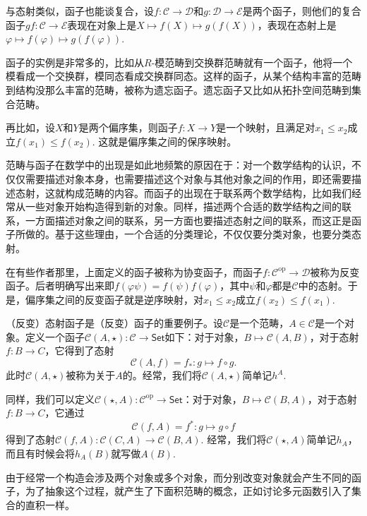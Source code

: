 与态射类似，函子也能谈复合，设$f:\mathcal{C}\to \mathcal{D}$和$g:\mathcal{D}\to \mathcal{E}$是两个函子，则他们的复合函子$gf:\mathcal{C}\to \mathcal{E}$表现在对象上是$X\mapsto f(X)\mapsto g(f(X))$，表现在态射上是$\varphi\mapsto f(\varphi)\mapsto g(f(\varphi))$. 

函子的实例是非常多的，比如从$R$-模范畴到交换群范畴就有一个函子，他将一个模看成一个交换群，模同态看成交换群同态。这样的函子，从某个结构丰富的范畴到结构没那么丰富的范畴，被称为遗忘函子。遗忘函子又比如从拓扑空间范畴到集合范畴。

再比如，设$X$和$Y$是两个偏序集，则函子$f:X\to Y$是一个映射，且满足对$x_1\leq x_2$成立$f(x_1)\leq f(x_2)$. 这就是偏序集之间的保序映射。

范畴与函子在数学中的出现是如此地频繁的原因在于：对一个数学结构的认识，不仅仅需要描述对象本身，也需要描述这个对象与其他对象之间的作用，即还需要描述态射，这就构成范畴的内容。而函子的出现在于联系两个数学结构，比如我们经常从一些对象开始构造得到新的对象。同样，描述两个合适的数学结构之间的联系，一方面描述对象之间的联系，另一方面也要描述态射之间的联系，而这正是函子所做的。基于这些理由，一个合适的分类理论，不仅仅要分类对象，也要分类态射。

在有些作者那里，上面定义的函子被称为协变函子，而函子$f:\mathcal{C}^{\mathrm{op}} \to \mathcal{D}$被称为反变函子。后者明确写出来即$f(\varphi\psi)=f(\psi)f(\varphi)$，其中$\psi$和$\varphi$都是$\mathcal{C}$中的态射。于是，偏序集之间的反变函子就是逆序映射，对$x_1\leq x_2$成立$f(x_2)\leq f(x_1)$.

\para （反变）态射函子是（反变）函子的重要例子。设$\mathcal{C}$是一个范畴，$A\in \mathcal{C}$是一个对象。定义一个函子$\mathcal{C}(A,\star):\mathcal{C}\to \mathsf{Set}$如下：对于对象，$B\mapsto \mathcal{C}(A,B)$，对于态射$f:B\to C$，它得到了态射
\[
	\mathcal{C}(A,f)=f_*: g\mapsto f\circ g.
\]
此时$\mathcal{C}(A,\star)$被称为关于$A$的。经常，我们将$\mathcal{C}(A,\star)$简单记$h^A$.

同样，我们可以定义$\mathcal{C}(\star,A):\mathcal{C}^{\text{op}}\to \mathsf{Set}$：对于对象，$B\mapsto \mathcal{C}(B,A)$，对于态射$f:B\to C$，它通过
\[
	\mathcal{C}(f,A)=f^*: g\mapsto g\circ f
\]
得到了态射$\mathcal{C}(f,A):\mathcal{C}(C,A)\to \mathcal{C}(B,A)$. 经常，我们将$\mathcal{C}(\star,A)$简单记$h_A$，而且有时候会将$h_A(B)$就写做$A(B)$.
\endpara

由于经常一个构造会涉及两个对象或多个对象，而分别改变对象就会产生不同的函子，为了抽象这个过程，就产生了下面积范畴的概念，正如讨论多元函数引入了集合的直积一样。

